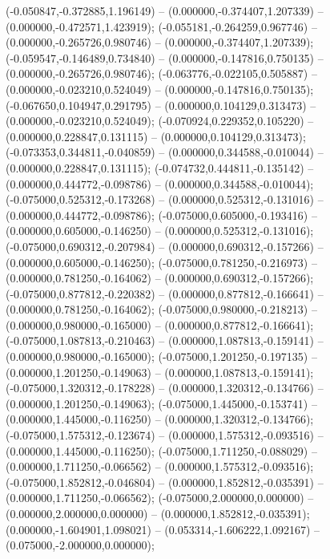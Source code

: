  (-0.050847,-0.372885,1.196149) -- (0.000000,-0.374407,1.207339) -- (0.000000,-0.472571,1.423919);
 (-0.055181,-0.264259,0.967746) -- (0.000000,-0.265726,0.980746) -- (0.000000,-0.374407,1.207339);
 (-0.059547,-0.146489,0.734840) -- (0.000000,-0.147816,0.750135) -- (0.000000,-0.265726,0.980746);
 (-0.063776,-0.022105,0.505887) -- (0.000000,-0.023210,0.524049) -- (0.000000,-0.147816,0.750135);
 (-0.067650,0.104947,0.291795) -- (0.000000,0.104129,0.313473) -- (0.000000,-0.023210,0.524049);
 (-0.070924,0.229352,0.105220) -- (0.000000,0.228847,0.131115) -- (0.000000,0.104129,0.313473);
 (-0.073353,0.344811,-0.040859) -- (0.000000,0.344588,-0.010044) -- (0.000000,0.228847,0.131115);
 (-0.074732,0.444811,-0.135142) -- (0.000000,0.444772,-0.098786) -- (0.000000,0.344588,-0.010044);
 (-0.075000,0.525312,-0.173268) -- (0.000000,0.525312,-0.131016) -- (0.000000,0.444772,-0.098786);
 (-0.075000,0.605000,-0.193416) -- (0.000000,0.605000,-0.146250) -- (0.000000,0.525312,-0.131016);
 (-0.075000,0.690312,-0.207984) -- (0.000000,0.690312,-0.157266) -- (0.000000,0.605000,-0.146250);
 (-0.075000,0.781250,-0.216973) -- (0.000000,0.781250,-0.164062) -- (0.000000,0.690312,-0.157266);
 (-0.075000,0.877812,-0.220382) -- (0.000000,0.877812,-0.166641) -- (0.000000,0.781250,-0.164062);
 (-0.075000,0.980000,-0.218213) -- (0.000000,0.980000,-0.165000) -- (0.000000,0.877812,-0.166641);
 (-0.075000,1.087813,-0.210463) -- (0.000000,1.087813,-0.159141) -- (0.000000,0.980000,-0.165000);
 (-0.075000,1.201250,-0.197135) -- (0.000000,1.201250,-0.149063) -- (0.000000,1.087813,-0.159141);
 (-0.075000,1.320312,-0.178228) -- (0.000000,1.320312,-0.134766) -- (0.000000,1.201250,-0.149063);
 (-0.075000,1.445000,-0.153741) -- (0.000000,1.445000,-0.116250) -- (0.000000,1.320312,-0.134766);
 (-0.075000,1.575312,-0.123674) -- (0.000000,1.575312,-0.093516) -- (0.000000,1.445000,-0.116250);
 (-0.075000,1.711250,-0.088029) -- (0.000000,1.711250,-0.066562) -- (0.000000,1.575312,-0.093516);
 (-0.075000,1.852812,-0.046804) -- (0.000000,1.852812,-0.035391) -- (0.000000,1.711250,-0.066562);
 (-0.075000,2.000000,0.000000) -- (0.000000,2.000000,0.000000) -- (0.000000,1.852812,-0.035391);
 (0.000000,-1.604901,1.098021) -- (0.053314,-1.606222,1.092167) -- (0.075000,-2.000000,0.000000);
